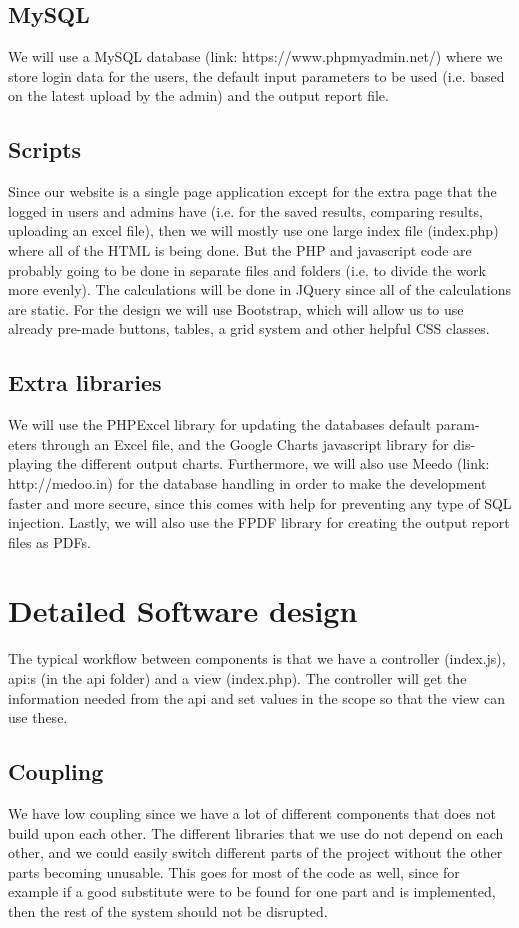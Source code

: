 \documentclass[]{article}
\begin{document}
\subsection{MySQL}
We will use a MySQL database (link: https://www.phpmyadmin.net/) where
we store login data for the users, the default input parameters to be used (i.e.
based on the latest upload by the admin) and the output report file.
\subsection{Scripts}
Since our website is a single page application except for the extra page that the
logged in users and admins have (i.e. for the saved results, comparing results,
uploading an excel file), then we will mostly use one large index file (index.php) where all of the HTML is being done. But the PHP and javascript code are probably going to be done in separate files and folders (i.e. to divide the work more evenly). The calculations will be done in JQuery since all of the calculations are static. For the design we will use Bootstrap, which will allow us to use already pre-made buttons, tables, a grid system and other helpful CSS classes. 


\subsection{Extra libraries}
We will use the PHPExcel library for updating the databases default param-
eters through an Excel file, and the Google Charts javascript library for dis-
playing the different output charts. Furthermore, we will also use Meedo (link:
http://medoo.in) for the database handling in order to make the development
faster and more secure, since this comes with help for preventing any type of
SQL injection. Lastly, we will also use the FPDF library for creating the output report files as PDFs.
\section{Detailed Software design}
The typical workflow between components is that we have a controller (index.js), api:s (in the api folder) and a view (index.php). The controller will get the information needed from the api and set values in the scope so that the view can use these. 

\subsection{Coupling}
We have low coupling since we have a lot of different components that does not build upon each other. The different libraries that we use do not depend on each other, and we could easily switch different parts of the project without the other parts becoming unusable. This goes for most of the code as well, since for example if a good substitute were to be found for one part and is implemented, then the rest of the system should not be disrupted.
\end{document}
